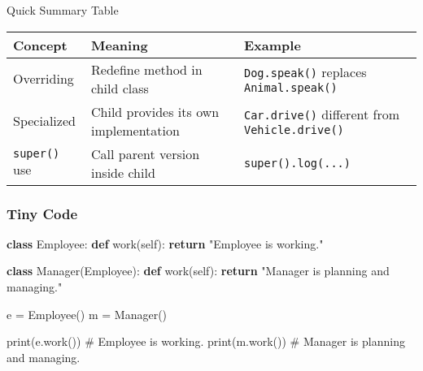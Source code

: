 \documentclass[
  letterpaper,
  DIV=11,
  numbers=noendperiod]{scrreprt}
\newenvironment{Shaded}{\begin{snugshade}}{\end{snugshade}}
\newcommand{\BuiltInTok}[1]{\textcolor[rgb]{0.00,0.23,0.31}{#1}}
\newcommand{\CommentTok}[1]{\textcolor[rgb]{0.37,0.37,0.37}{#1}}
\newcommand{\ControlFlowTok}[1]{\textcolor[rgb]{0.00,0.23,0.31}{\textbf{#1}}}
\newcommand{\KeywordTok}[1]{\textcolor[rgb]{0.00,0.23,0.31}{\textbf{#1}}}
\newcommand{\NormalTok}[1]{\textcolor[rgb]{0.00,0.23,0.31}{#1}}
\newcommand{\OperatorTok}[1]{\textcolor[rgb]{0.37,0.37,0.37}{#1}}
\newcommand{\StringTok}[1]{\textcolor[rgb]{0.13,0.47,0.30}{#1}}
\newcommand{\VariableTok}[1]{\textcolor[rgb]{0.07,0.07,0.07}{#1}}
\begin{document}
Quick Summary Table

\begin{longtable}[]{@{}
  >{\raggedright\arraybackslash}p{}
  >{\raggedright\arraybackslash}p{}
  >{\raggedright\arraybackslash}p{}@{}}
\toprule\noalign{}
\begin{minipage}[b]{\linewidth}\raggedright
Concept
\end{minipage} & \begin{minipage}[b]{\linewidth}\raggedright
Meaning
\end{minipage} & \begin{minipage}[b]{\linewidth}\raggedright
Example
\end{minipage} \\
\midrule\noalign{}
\endhead
\bottomrule\noalign{}
\endlastfoot
Overriding & Redefine method in child class & \texttt{Dog.speak()}
replaces \texttt{Animal.speak()} \\
Specialized & Child provides its own implementation &
\texttt{Car.drive()} different from \texttt{Vehicle.drive()} \\
\texttt{super()} use & Call parent version inside child &
\texttt{super().log(...)} \\
\end{longtable}

\subsubsection{Tiny Code}\label{tiny-code-65}

\begin{Shaded}
\begin{Highlighting}[]
\KeywordTok{class}\NormalTok{ Employee:}
    \KeywordTok{def}\NormalTok{ work(}\VariableTok{self}\NormalTok{):}
        \ControlFlowTok{return} \StringTok{"Employee is working."}

\KeywordTok{class}\NormalTok{ Manager(Employee):}
    \KeywordTok{def}\NormalTok{ work(}\VariableTok{self}\NormalTok{):}
        \ControlFlowTok{return} \StringTok{"Manager is planning and managing."}

\NormalTok{e }\OperatorTok{=}\NormalTok{ Employee()}
\NormalTok{m }\OperatorTok{=}\NormalTok{ Manager()}

\BuiltInTok{print}\NormalTok{(e.work())   }\CommentTok{\# Employee is working.}
\BuiltInTok{print}\NormalTok{(m.work())   }\CommentTok{\# Manager is planning and managing.}
\end{Highlighting}
\end{Shaded}
\end{document}
